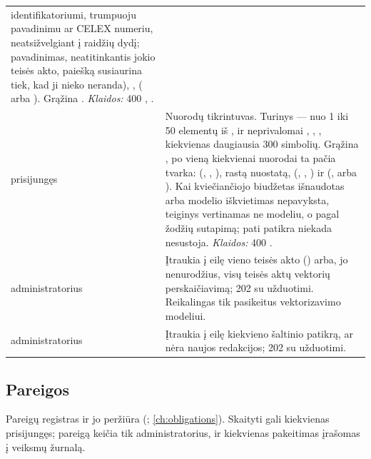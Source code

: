 \begin{xltabular}{\textwidth}{@{}L{19mm}Y@{}}
  identifikatoriumi, trumpuoju pavadinimu ar CELEX numeriu, neatsižvelgiant į raidžių dydį;
  pavadinimas, neatitinkantis jokio teisės akto, paiešką susiaurina tiek, kad ji nieko
  neranda), ,  ( arba ). Grąžina
  . \emph{Klaidos:} 400 , . \\
\addlinespace
{}
prisijungęs & Nuorodų tikrintuvas. Turinys  --- nuo 1 iki 50 elementų iš
  ,  ir neprivalomai , ,
  , kiekvienas daugiausia 300 simbolių. Grąžina , po vieną
  kiekvienai nuorodai ta pačia tvarka:  (, ,
  ), rastą nuostatą,  (, ,
  ) ir  (,  arba ). Kai
  kviečiančiojo biudžetas išnaudotas arba modelio iškvietimas nepavyksta, teiginys vertinamas
  ne modeliu, o pagal žodžių sutapimą; pati patikra niekada nesustoja. \emph{Klaidos:} 400
  . \\
\addlinespace
{}
administratorius & Įtraukia į eilę vieno teisės akto () arba, jo nenurodžius,
  visų teisės aktų vektorių perskaičiavimą; 202 su užduotimi. Reikalingas tik pasikeitus
  vektorizavimo modeliui. \\
\addlinespace
{}
administratorius & Įtraukia į eilę kiekvieno šaltinio patikrą, ar nėra naujos redakcijos; 202
  su užduotimi. \\
\end{xltabular}

\subsection{Pareigos}\label{sec:api:obligations}

Pareigų registras ir jo peržiūra (; \cref{ch:obligations}).
Skaityti gali kiekvienas prisijungęs; pareigą keičia tik administratorius, ir kiekvienas
pakeitimas įrašomas į veiksmų žurnalą.

